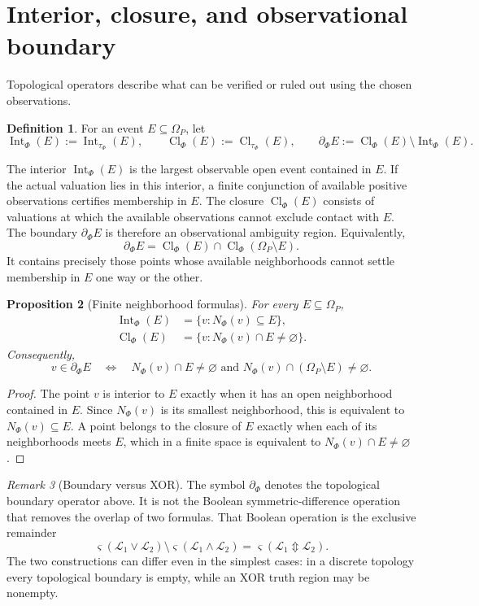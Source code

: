 \documentclass[11pt]{article}
\theoremstyle{definition}
\newtheorem{definition}{Definition}[section]
\theoremstyle{plain}
\newtheorem{proposition}[definition]{Proposition}
\theoremstyle{remark}
\newtheorem{remark}[definition]{Remark}
\newcommand{\Int}{\operatorname{Int}}
\newcommand{\Cl}{\operatorname{Cl}}
\newcommand{\bd}{\partial}
\begin{document}
\section{Interior, closure, and observational boundary}

Topological operators describe what can be verified or ruled out using the
chosen observations.

\begin{definition}
For an event $E\subseteq\Omega_P$, let
\[
 \Int_\Phi(E):=\Int_{\tau_\Phi}(E),\qquad
 \Cl_\Phi(E):=\Cl_{\tau_\Phi}(E),\qquad
 \bd_\Phi E:=\Cl_\Phi(E)\setminus\Int_\Phi(E).
\]
\end{definition}

The interior $\Int_\Phi(E)$ is the largest observable open event contained in
$E$.  If the actual valuation lies in this interior, a finite conjunction of
available positive observations certifies membership in $E$.  The closure $\Cl_\Phi(E)$ consists of
valuations at which the available observations cannot exclude contact with
$E$.  The boundary $\bd_\Phi E$ is therefore an observational ambiguity region.
Equivalently,
\[
 \bd_\Phi E
 =\Cl_\Phi(E)\cap\Cl_\Phi(\Omega_P\setminus E).
\]
It contains precisely those points whose available neighborhoods cannot settle
membership in $E$ one way or the other.

\begin{proposition}[Finite neighborhood formulas]
For every $E\subseteq\Omega_P$,
\begin{align*}
 \Int_\Phi(E)&=\{v:N_\Phi(v)\subseteq E\},\\
 \Cl_\Phi(E)&=\{v:N_\Phi(v)\cap E\neq\varnothing\}.
\end{align*}
Consequently,
\[
 v\in\bd_\Phi E
 \quad\Longleftrightarrow\quad
 N_\Phi(v)\cap E\neq\varnothing
 \text{ and }
 N_\Phi(v)\cap(\Omega_P\setminus E)\neq\varnothing.
\]
\end{proposition}

\begin{proof}
The point $v$ is interior to $E$ exactly when it has an open neighborhood
contained in $E$.  Since $N_\Phi(v)$ is its smallest neighborhood, this is
equivalent to $N_\Phi(v)\subseteq E$.  A point belongs to the closure of $E$
exactly when each of its neighborhoods meets $E$, which in a finite space is
equivalent to $N_\Phi(v)\cap E\neq\varnothing$.
\end{proof}

\begin{remark}[Boundary versus XOR]
The symbol $\bd_\Phi$ denotes the topological boundary operator above.  It is
not the Boolean symmetric-difference operation that removes the overlap of two
formulas.  That Boolean operation is the exclusive remainder
\[
 \varsigma(\mathcal L_1\vee\mathcal L_2)
 \setminus\varsigma(\mathcal L_1\wedge\mathcal L_2)
 =\varsigma(\mathcal L_1\Updownarrow\mathcal L_2).
\]
The two constructions can differ even in the simplest cases: in a discrete
topology every topological boundary is empty, while an XOR truth region
may be nonempty.
\end{remark}
\end{document}
